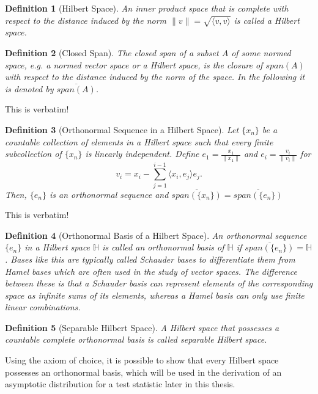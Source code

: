 \documentclass[12pt, a4paper]{article}
\theoremstyle{MAstyle} \newtheorem{assumption}{Assumption}[section]
\theoremstyle{MAstyle} \newtheorem{definition}{Definition}[section]
\begin{document}
			\begin{definition}[Hilbert Space]
				An inner product space that is complete with respect to the distance induced by the norm $\| v \| = \sqrt{\langle v, v\rangle}$ is called a Hilbert space.
			\end{definition}
		
			\begin{definition}[Closed Span]
				The closed span of a subset $A$ of some normed space, e.g. a normed vector space or a Hilbert space, is the closure of $\textit{span}\left(A\right)$ with respect to the distance induced by the norm of the space. In the following it is denoted by $\overline{{\textit{span}\left(A\right)}}$.
			\end{definition}
		
			{\color{red} This is verbatim!}
			\begin{definition}[Orthonormal Sequence in a Hilbert Space]
				Let $\{x_n\}$ be a countable collection of elements in a Hilbert space such that every finite subcollection of $\{x_n\}$ is linearly independent. Define $e_1 = \frac{x_1}{\| x_1 \|}$ and $e_i = \frac{v_i}{\| v_i \|}$ for 
				$$v_i = x_i - \sum_{j = 1}^{i - 1}\langle x_i, e_j\rangle e_j.$$
				Then, $\{e_n\}$ is an orthonormal sequence and $\overline{{\textit{span}\left(\{x_n\}\right)}} = \overline{{\textit{span}\left(\{e_n\}\right)}}$
			\end{definition}
		
			{\color{red} This is verbatim!}
			\begin{definition}[Orthonormal Basis of a Hilbert Space]
				An orthonormal sequence $\{e_n\}$ in a Hilbert space $\mathbb{H}$ is called an orthonormal basis of $\mathbb{H}$ if $\overline{{\textit{span}\left(\{e_n\}\right)}} = \mathbb{H}$. Bases like this are typically called Schauder bases to differentiate them from Hamel bases which are often used in the study of vector spaces. The difference between these is that a Schauder basis can represent elements of the corresponding space as infinite sums of its elements, whereas a Hamel basis can only use finite linear combinations.
			\end{definition}
		
			\begin{definition}[Separable Hilbert Space]
				A Hilbert space that possesses a countable complete orthonormal basis is called separable Hilbert space.
			\end{definition}
			Using the axiom of choice, it is possible to show that every Hilbert space possesses an orthonormal basis, which will be used in the derivation of an asymptotic distribution for a test statistic later in this thesis.
		
\end{document}
